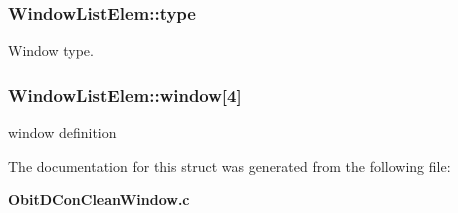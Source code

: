 \subsubsection{ {\bf Window\-List\-Elem::type}}\label{structWindowListElem_o1}


Window type. 

\subsubsection{ {\bf Window\-List\-Elem::window}[4]}\label{structWindowListElem_o2}


window definition 



The documentation for this struct was generated from the following file:\begin{CompactItemize}
\item 
{\bf Obit\-DCon\-Clean\-Window.c}\end{CompactItemize}
